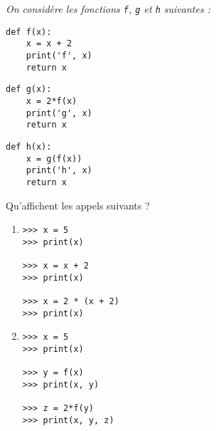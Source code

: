 \begin{td}\label{td:portee2}
\em
On considère les fonctions {\tt f}, {\tt g} et {\tt h} suivantes :
\begin{center}
\begin{py}{4cm}
\begin{verbatim}
def f(x):
    x = x + 2
    print('f', x)
    return x
\end{verbatim}
\end{py}\hspace*{1cm}
\begin{py}{4cm}
\begin{verbatim}
def g(x):
    x = 2*f(x)
    print('g', x)
    return x
\end{verbatim}
\end{py}\hspace*{1cm}
\begin{py}{4cm}
\begin{verbatim}
def h(x):
    x = g(f(x))
    print('h', x)
    return x
\end{verbatim}
\end{py}
\end{center}

Qu'affichent les appels suivants ?
\vspace*{2mm}

\begin{minipage}[t]{7cm}
\begin{enumerate}
\item 

\begin{py}{4cm}
\begin{verbatim}
>>> x = 5
>>> print(x)

>>> x = x + 2
>>> print(x)

>>> x = 2 * (x + 2)
>>> print(x)

\end{verbatim}
\end{py}

\item 

\begin{py}{4cm}
\begin{verbatim}
>>> x = 5
>>> print(x)

>>> y = f(x)
>>> print(x, y)

>>> z = 2*f(y)
>>> print(x, y, z)

\end{verbatim}
\end{py}



\end{enumerate}
\end{minipage}
\end{td}
